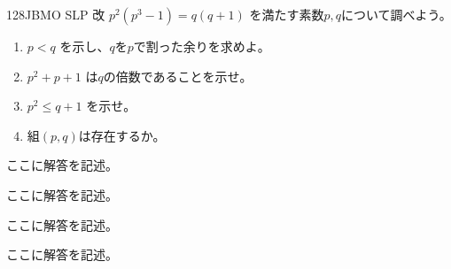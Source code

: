 \begin{prob}{128}{}{JBMO SLP 改}
 $p^2(p^3-1)=q(q+1)$ を満たす素数$p, q$について調べよう。
 \begin{enumerate}
  \item $p<q$ を示し、$q$を$p$で割った余りを求めよ。
  \item $p^2+p+1$ は$q$の倍数であることを示せ。
  \item $p^2\le q+1$ を示せ。
  \item 組$(p,q)$は存在するか。
 \end{enumerate}
\end{prob}
ここに解答を記述。

ここに解答を記述。

ここに解答を記述。

ここに解答を記述。
